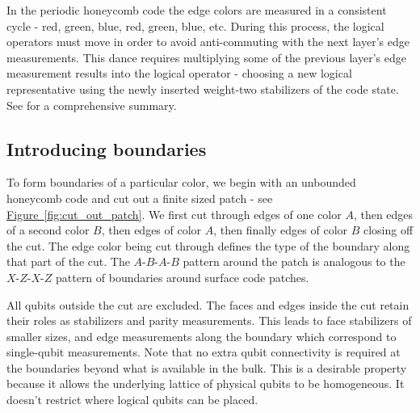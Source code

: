 \documentclass[onecolumn,unpublished,a4paper]{quantumarticle}
\theoremstyle{definition}
\theoremstyle{definition}
\theoremstyle{definition}
\newcommand{\fig}[1]{\hyperref[fig:#1]{Figure~\ref*{fig:#1}}}
\begin{document}
In the periodic honeycomb code the edge colors are measured in a consistent cycle - red, green, blue, red, green, blue, etc.
During this process, the logical operators must move in order to avoid anti-commuting with the next layer's edge measurements.  
This dance requires multiplying some of the previous layer's edge measurement results into the logical operator - choosing a new logical representative using the newly inserted weight-two stabilizers of the code state.
See \cite{gidney2021honeycombmemory} for a comprehensive summary.

\subsection{Introducing boundaries}

To form boundaries of a particular color, we begin with an unbounded honeycomb code and cut out a finite sized patch - see \fig{cut_out_patch}.
We first cut through edges of one color $A$, then edges of a second color $B$, then edges of color $A$, then finally edges of color $B$ closing off the cut.
The edge color being cut through defines the type of the boundary along that part of the cut.
The $A$-$B$-$A$-$B$ pattern around the patch is analogous to the $X$-$Z$-$X$-$Z$ pattern of boundaries around surface code patches.

All qubits outside the cut are excluded.
The faces and edges inside the cut retain their roles as stabilizers and parity measurements.
This leads to face stabilizers of smaller sizes, and edge measurements along the boundary which correspond to single-qubit measurements.
Note that no extra qubit connectivity is required at the boundaries beyond what is available in the bulk.
This is a desirable property because it allows the underlying lattice of physical qubits to be homogeneous.
It doesn't restrict where logical qubits can be placed.
\end{document}
